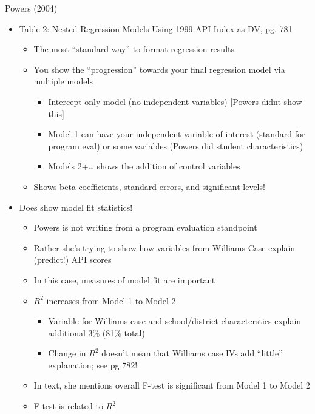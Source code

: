 \documentclass[
  8pt,
  ignorenonframetext,
  dvipsnames]{beamer}
\providecommand{\tightlist}{%
  \setlength{\itemsep}{0pt}\setlength{\parskip}{0pt}}
\let\olditem\item
\renewcommand{\item}{%
  \olditem\vspace{4pt}
}
\begin{document}
\begin{frame}{Powers (2004)}
\protect\hypertarget{powers-2004-1}{}

\begin{itemize}
\tightlist
\item
  Table 2: Nested Regression Models Using 1999 API Index as DV, pg. 781

  \begin{itemize}
  \tightlist
  \item
    The most ``standard way'' to format regression results
  \item
    You show the ``progression'' towards your final regression model via
    multiple models

    \begin{itemize}
    \tightlist
    \item
      Intercept-only model (no independent variables) {[}Powers didnt
      show this{]}
    \item
      Model 1 can have your independent variable of interest (standard
      for program eval) or some variables (Powers did student
      characteristics)
    \item
      Models 2+\ldots{} shows the addition of control variables
    \end{itemize}
  \item
    Shows beta coefficients, standard errors, and significant levels!
  \end{itemize}
\item
  Does show model fit statistics!

  \begin{itemize}
  \tightlist
  \item
    Powers is not writing from a program evaluation standpoint
  \item
    Rather she's trying to show how variables from Williams Case explain
    (predict!) API scores
  \item
    In this case, measures of model fit are important
  \item
    \(R^2\) increases from Model 1 to Model 2

    \begin{itemize}
    \tightlist
    \item
      Variable for Williams case and school/district characterstics
      explain additional 3\% (81\% total)
    \item
      Change in \(R^2\) doesn't mean that Williams case IVs add
      ``little'' explanation; see pg 782!
    \end{itemize}
  \item
    In text, she mentions overall F-test is significant from Model 1 to
    Model 2
  \item
    F-test is related to \(R^2\)


\end{itemize}
\end{itemize}
\end{frame}
\end{document}
